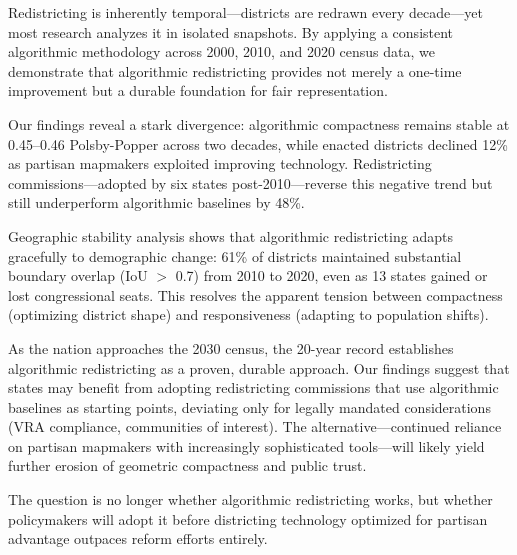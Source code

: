
Redistricting is inherently temporal—districts are redrawn every decade—yet most research analyzes it in isolated snapshots. By applying a consistent algorithmic methodology across 2000, 2010, and 2020 census data, we demonstrate that algorithmic redistricting provides not merely a one-time improvement but a durable foundation for fair representation.

Our findings reveal a stark divergence: algorithmic compactness remains stable at 0.45--0.46 Polsby-Popper across two decades, while enacted districts declined 12\% as partisan mapmakers exploited improving technology. Redistricting commissions—adopted by six states post-2010—reverse this negative trend but still underperform algorithmic baselines by 48\%.

Geographic stability analysis shows that algorithmic redistricting adapts gracefully to demographic change: 61\% of districts maintained substantial boundary overlap (IoU $>$ 0.7) from 2010 to 2020, even as 13 states gained or lost congressional seats. This resolves the apparent tension between compactness (optimizing district shape) and responsiveness (adapting to population shifts).

As the nation approaches the 2030 census, the 20-year record establishes algorithmic redistricting as a proven, durable approach. Our findings suggest that states may benefit from adopting redistricting commissions that use algorithmic baselines as starting points, deviating only for legally mandated considerations (VRA compliance, communities of interest). The alternative—continued reliance on partisan mapmakers with increasingly sophisticated tools—will likely yield further erosion of geometric compactness and public trust.

The question is no longer whether algorithmic redistricting works, but whether policymakers will adopt it before districting technology optimized for partisan advantage outpaces reform efforts entirely.
